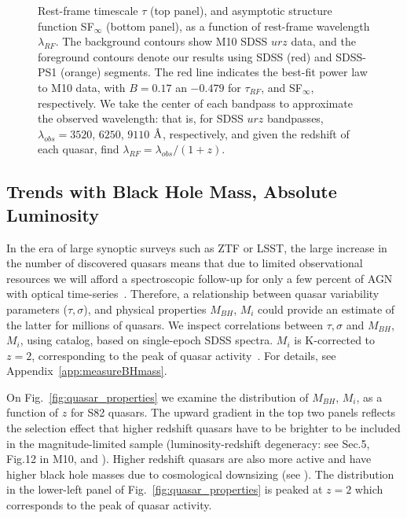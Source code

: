 \documentclass[twocolumn]{aastex62}
\let\oldAA\AA
\renewcommand{\AA}{\text{\normalfont\oldAA}}
\begin{document}
  
\begin{figure} %
	\caption{Rest-frame timescale $\tau$ (top panel), and asymptotic structure function SF$_{\infty}$ (bottom panel), as a function of rest-frame wavelength $\lambda_{RF}$. The background contours show M10 SDSS $ urz $  data, and the foreground contours  denote our results using  SDSS (red) and SDSS-PS1 (orange) segments. The red line indicates the best-fit power law to M10 data, with $B=0.17$ an $-0.479$ for $\tau_{RF}$, and SF$_{\infty}$, respectively. We take the center of each bandpass to approximate the  observed wavelength: that is, for SDSS $urz$ bandpasses,  $\lambda_{obs} = 3520$, $6250$, $9110$ $\mbox{\AA}$, respectively, and given the redshift of each quasar, find $\lambda_{RF}=\lambda_{obs} / (1+z)$.}
	\label{fig:lambda_dependence}
\end{figure} 




\subsection{Trends with Black Hole Mass, Absolute Luminosity}

In the era of large synoptic surveys such as ZTF or LSST, the large increase in the number of discovered quasars means that due to limited observational resources we will afford a spectroscopic follow-up for only a few percent of AGN with optical time-series~\citep{ivezic2019}. Therefore, a relationship between quasar variability parameters ($\tau, \sigma$), and physical properties $M_{BH}$, $M_{i}$ could provide an estimate of the latter for millions of quasars. We inspect correlations between $\tau, \sigma$  and $M_{BH}$, $M_{i}$, using \cite{shen2011} catalog, based on single-epoch SDSS spectra. $M_{i}$ is K-corrected to  $z= 2$, corresponding to the peak of quasar activity~\citep{richards2006a}. For details, see Appendix~\ref{app:measureBHmass}.

On Fig.~\ref{fig:quasar_properties} we examine the distribution of $M_{BH}$, $M_{i}$, as a function of $z$ for S82 quasars. The upward gradient in the top two panels reflects the selection effect that higher redshift quasars have to be brighter to be included in the magnitude-limited sample (luminosity-redshift degeneracy: see Sec.5, Fig.12 in M10, and \citealt{dong2018}). Higher redshift quasars are also more active  and have higher black hole masses due to cosmological downsizing (see \citealt{babic2007,labita2009, mclure2004}). The distribution in the lower-left panel of Fig.~\ref{fig:quasar_properties} is peaked at $z=2$ which corresponds to the peak of quasar activity. 
\end{document}
